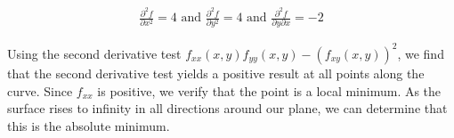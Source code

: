 \documentclass[11pt]{article}
\begin{document}
\begin{align*}
  \frac{\partial^2 f}{\partial x^2} = 4 \text{ and }
  \frac{\partial^2 f}{\partial y^2} = 4 \text{ and }
  \frac{\partial^2 f}{\partial y \partial x} = -2
\end{align*}

Using the second derivative test $f_{xx}(x, y)f_{yy}(x, y) - (f_{xy}(x, y))^2$,
we find that the second derivative test yields a positive result at all points
along the curve.  Since $f_{xx}$ is positive, we verify that the point is a
local minimum.  As the surface rises to infinity in all directions around our
plane, we can determine that this is the absolute minimum.
\end{document}

